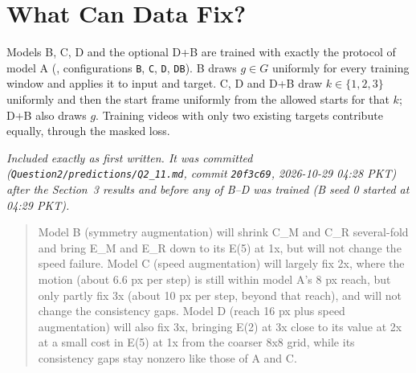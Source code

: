 \section{What Can Data Fix?}
Models B, C, D and the optional D+B are trained with exactly the protocol of model A
(, configurations \texttt{B}, \texttt{C}, \texttt{D}, \texttt{DB}). B draws
$g\in G$ uniformly for every training window and applies it to input and target. C, D and D+B draw
$k\in\{1,2,3\}$ uniformly and then the start frame uniformly from the allowed starts for that $k$; D+B
also draws $g$. Training videos with only two existing targets contribute equally, through the masked loss.

 \emph{Included exactly as first written. It was committed (\texttt{Question2/predictions/Q2\_11.md},
commit \texttt{20f3c69}, 2026-10-29 04:28 PKT) after the Section~3 results and before any of B--D was trained
(B seed 0 started at 04:29 PKT).}

\begin{quote}\small
Model B (symmetry augmentation) will shrink C\_M and C\_R several-fold and bring E\_M and
E\_R down to its E(5) at 1x, but will not change the speed failure. Model C (speed augmentation) will
largely fix 2x, where the motion (about 6.6 px per step) is still within model A's 8 px reach, but only
partly fix 3x (about 10 px per step, beyond that reach), and will not change the consistency gaps.
Model D (reach 16 px plus speed augmentation) will also fix 3x, bringing E(2) at 3x close to its value at
2x at a small cost in E(5) at 1x from the coarser 8x8 grid, while its consistency gaps stay nonzero like
those of A and C.
\end{quote}

\begin{table}[H]
\centering
\caption{Models A--D and the optional D+B on the test set. $C_T$ and $E_T$ at 1$\times$; $\Ex2$ uses the
first two horizons. Training time is the mean wall-clock time per epoch over 30 epochs; inference time is
for all 1,000 test videos at batch 32 (hardware in the introduction to this question).}
\label{tab:q2-t5}
\resizebox{\linewidth}{!}{}
\end{table}

